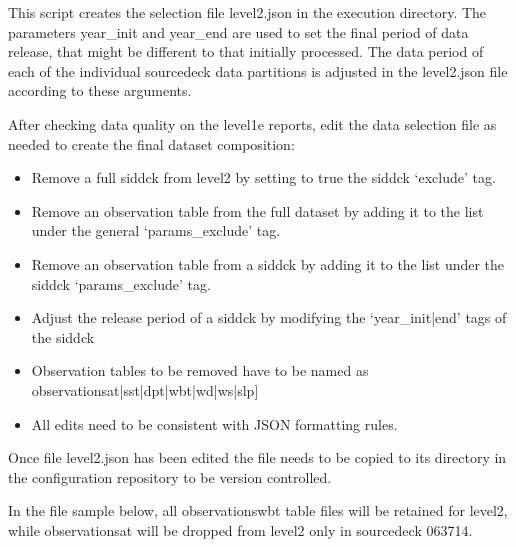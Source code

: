 \documentclass[letterpaper,10pt,english]{sphinxmanual}
\begin{document}
This script creates the selection file level2.json in the execution directory.
The parameters year\_init and year\_end are used to set the final period of data
release, that might be different to that initially processed. The data period of
each of the individual source\sphinxhyphen{}deck data partitions is adjusted in the level2.json
file according to these arguments.

After checking data quality on the level1e
reports, edit the data selection file as needed to create the final dataset
composition:
\begin{itemize}
\item {}
Remove a full sid\sphinxhyphen{}dck from level2 by setting to true the sid\sphinxhyphen{}dck ‘exclude’ tag.

\item {}
Remove an observation table from the full dataset by adding it to the list under the general ‘params\_exclude’ tag.

\item {}
Remove an observation table from a sid\sphinxhyphen{}dck by adding it to the list under the sid\sphinxhyphen{}dck ‘params\_exclude’ tag.

\item {}
Adjust the release period of a sid\sphinxhyphen{}dck by modifying the ‘year\_init|end’ tags of the sid\sphinxhyphen{}dck

\item {}
Observation tables to be removed have to be named as observations\sphinxhyphen{}{[}at|sst|dpt|wbt|wd|ws|slp{]}

\item {}
All edits need to be consistent with JSON formatting rules.

\end{itemize}

Once file level2.json has been edited the file needs to be copied to its
directory in the configuration repository to be version controlled.

In the file sample below, all observations\sphinxhyphen{}wbt table files will be retained for
level2, while observations\sphinxhyphen{}at will be dropped from level2 only in source\sphinxhyphen{}deck
063\sphinxhyphen{}714.
\end{document}
